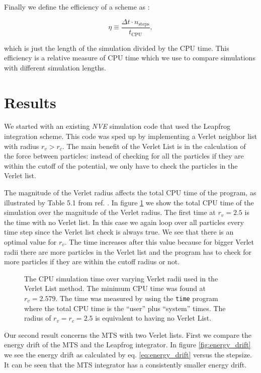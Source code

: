 \documentclass[a4paper]{article}
\begin{document}
Finally we define the efficiency of a scheme as \cite{molsim}:

\begin{equation}
\label{eq:efficiency}
\eta \equiv \frac{\Delta t \cdot n_\text{steps}}{t_\text{CPU}},
\end{equation}

which is just the length of the simulation divided by the CPU time. This efficiency is a relative
measure of CPU time which we use to compare simulations with different simulation lengths.

\section{Results} 
We started with an existing \textit{NVE} simulation code \cite{case_study} that used the Leapfrog
integration scheme. This code was sped up by implementing a Verlet neighbor list with radius
$r_v>r_c$. The main benefit of the Verlet List is in the calculation of the force between particles:
instead of checking for all the particles if they are within the cutoff of the potential, we only
have to check the particles in the Verlet list.

The magnitude of the Verlet radius affects the total CPU time of the program, as illustrated by
Table 5.1 from ref. \cite{allen_tildesley}. In figure \ref{fig:verlet} we show the total CPU time of
the simulation over the magnitude of the Verlet radius. The first time at $r_v=2.5$ is the time with
no Verlet list. In this case we again loop over all particles every time step since the Verlet list
check is always true. We see that there is an optimal value for $r_v$. The time increases after this
value because for bigger Verlet radii there are more particles in the Verlet list and the program
has to check for more particles if they are within the cutoff radius or not.

\begin{figure}
\caption{The CPU simulation time over varying Verlet radii used in the Verlet List method. The
  minimum CPU time was found at $r_v=2.579$. The time was measured by using the
  \texttt{time} program where the total CPU time is the ``user'' plus ``system'' times.
  The radius of $r_v=r_c=2.5$ is equivalent to having no Verlet List.}
\label{fig:verlet}
\end{figure}

Our second result concerns the MTS with two Verlet lists. First we compare the energy drift of the
MTS and the Leapfrog integrator. In figure \ref{fig:energy_drift} we see the energy drift as
calculated by eq. \ref{eq:energy_drift} versus the stepsize. It can be seen that the MTS integrator
has a consistently smaller energy drift.
\end{document}
